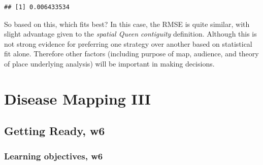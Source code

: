 \documentclass[
]{book}
\begin{document}
\begin{lstlisting}
## [1] 0.006433534
\end{lstlisting}

So based on this, which fits best? In this case, the RMSE is quite similar, with slight advantage given to the \emph{spatial Queen contiguity} definition. Although this is not strong evidence for preferring one strategy over another based on statistical fit alone. Therefore other factors (including purpose of map, audience, and theory of place underlying analysis) will be important in making decisions.

\hypertarget{disease-mapping-iii}{%
\chapter{Disease Mapping III}\label{disease-mapping-iii}}

\hypertarget{getting-ready-w6}{%
\section{Getting Ready, w6}\label{getting-ready-w6}}

\hypertarget{learning-objectives-w6}{%
\subsection{Learning objectives, w6}\label{learning-objectives-w6}}

 
  \providecommand{\huxb}[2]{\arrayrulecolor[RGB]{#1}\global\arrayrulewidth=#2pt}
  \providecommand{\huxvb}[2]{\color[RGB]{#1}\vrule width #2pt}
  \providecommand{\huxtpad}[1]{\rule{0pt}{#1}}
  \providecommand{\huxbpad}[1]{\rule[-#1]{0pt}{#1}}
\end{document}
